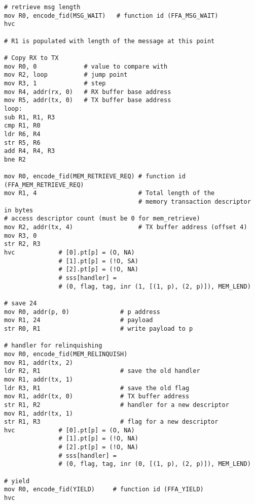 \documentclass{article}
\begin{document}
\begin{lstlisting}[caption={VM 1}]
# retrieve msg length
mov R0, encode_fid(MSG_WAIT)   # function id (FFA_MSG_WAIT)
hvc

# R1 is populated with length of the message at this point

# Copy RX to TX
mov R0, 0             # value to compare with
mov R2, loop          # jump point
mov R3, 1             # step
mov R4, addr(rx, 0)   # RX buffer base address
mov R5, addr(tx, 0)   # TX buffer base address
loop:
sub R1, R1, R3
cmp R1, R0
ldr R6, R4
str R5, R6
add R4, R4, R3
bne R2

mov R0, encode_fid(MEM_RETRIEVE_REQ) # function id (FFA_MEM_RETRIEVE_REQ)
mov R1, 4                            # Total length of the  
                                     # memory transaction descriptor in bytes
# access descriptor count (must be 0 for mem_retrieve)
mov R2, addr(tx, 4)                  # TX buffer address (offset 4)
mov R3, 0
str R2, R3                                    
hvc            # [0].pt[p] = (O, NA)
               # [1].pt[p] = (!O, SA)
               # [2].pt[p] = (!O, NA)
               # sss[handler] = 
               # (0, flag, tag, inr (1, [(1, p), (2, p)]), MEM_LEND)

# save 24
mov R0, addr(p, 0)              # p address
mov R1, 24                      # payload
str R0, R1                      # write payload to p

# handler for relinquishing
mov R0, encode_fid(MEM_RELINQUISH)
mov R1, addr(tx, 2)
ldr R2, R1                      # save the old handler
mov R1, addr(tx, 1)
ldr R3, R1                      # save the old flag
mov R1, addr(tx, 0)             # TX buffer address
str R1, R2                      # handler for a new descriptor
mov R1, addr(tx, 1)
str R1, R3                      # flag for a new descriptor
hvc            # [0].pt[p] = (O, NA)
               # [1].pt[p] = (!O, NA)
               # [2].pt[p] = (!O, NA)
               # sss[handler] = 
               # (0, flag, tag, inr (0, [(1, p), (2, p)]), MEM_LEND)

# yield
mov R0, encode_fid(YIELD)     # function id (FFA_YIELD)
hvc
\end{lstlisting}
\end{document}
